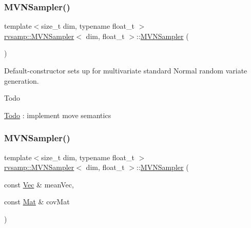 \subsubsection{\texorpdfstring{M\+V\+N\+Sampler()}{MVNSampler()}\hspace{0.1cm}{\footnotesize\ttfamily [1/2]}}
{\footnotesize\ttfamily template$<$size\+\_\+t dim, typename float\+\_\+t $>$ \\
\hyperlink{classrvsamp_1_1MVNSampler}{rvsamp\+::\+M\+V\+N\+Sampler}$<$ dim, float\+\_\+t $>$\+::\hyperlink{classrvsamp_1_1MVNSampler}{M\+V\+N\+Sampler} (\begin{DoxyParamCaption}{ }\end{DoxyParamCaption})}



Default-\/constructor sets up for multivariate standard Normal random variate generation. 

\begin{DoxyRefDesc}{Todo}
\item[\hyperlink{todo__todo000002}{Todo}]\+: implement move semantics \end{DoxyRefDesc}
\mbox{\label{classrvsamp_1_1MVNSampler_ac41aa5fc1e96bdd0f1577f8382958e7e}} 
\subsubsection{\texorpdfstring{M\+V\+N\+Sampler()}{MVNSampler()}\hspace{0.1cm}{\footnotesize\ttfamily [2/2]}}
{\footnotesize\ttfamily template$<$size\+\_\+t dim, typename float\+\_\+t $>$ \\
\hyperlink{classrvsamp_1_1MVNSampler}{rvsamp\+::\+M\+V\+N\+Sampler}$<$ dim, float\+\_\+t $>$\+::\hyperlink{classrvsamp_1_1MVNSampler}{M\+V\+N\+Sampler} (\begin{DoxyParamCaption}\item[{const \hyperlink{classrvsamp_1_1MVNSampler_a1110bc1695c5c959914602dbaf2f6878}{Vec} \&}]{mean\+Vec,  }\item[{const \hyperlink{classrvsamp_1_1MVNSampler_ad6891a72b508fd59263c6d62b6bffd14}{Mat} \&}]{cov\+Mat }\end{DoxyParamCaption})}



